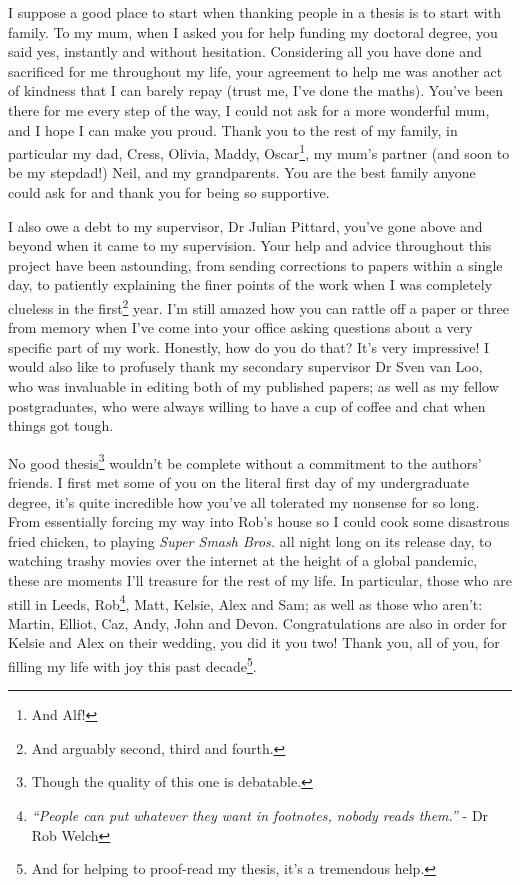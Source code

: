 

\begin{acknowledgements}      %

\setlength{\parindent}{17.62482pt}
\setlength{\parskip}{0.0pt plus 1.0pt}

I suppose a good place to start when thanking people in a thesis is to start with family.
To my mum, when I asked you for help funding my doctoral degree, you said yes, instantly and without hesitation.
Considering all you have done and sacrificed for me throughout my life, your agreement to help me was another act of kindness that I can barely repay (trust me, I've done the maths).
You've been there for me every step of the way, I could not ask for a more wonderful mum, and I hope I can make you proud.
Thank you to the rest of my family, in particular my dad, Cress, Olivia, Maddy, Oscar\footnote{And Alf!}, my mum's partner (and soon to be my stepdad!) Neil, and my grandparents.
You are the best family anyone could ask for and thank you for being so supportive.

I also owe a debt to my supervisor, Dr Julian Pittard, you've gone above and beyond when it came to my supervision.
Your help and advice throughout this project have been astounding, from sending corrections to papers within a single day, to patiently explaining the finer points of the work when I was completely clueless in the first\footnote{And arguably second, third and fourth.} year.
I'm still amazed how you can rattle off a paper or three from memory when I've come into your office asking questions about a very specific part of my work.
Honestly, how do you do that? It's very impressive!
I would also like to profusely thank my secondary supervisor Dr Sven van Loo, who was invaluable in editing both of my published papers; as well as my fellow postgraduates, who were always willing to have a cup of coffee and chat when things got tough.

No good thesis\footnote{Though the quality of this one is debatable.} wouldn't be complete without a commitment to the authors' friends.
I first met some of you on the literal first day of my undergraduate degree, it's quite incredible how you've all tolerated my nonsense for so long.
From essentially forcing my way into Rob's house so I could cook some disastrous fried chicken, to playing \textit{Super Smash Bros.} all night long on its release day, to watching trashy movies over the internet at the height of a global pandemic, these are moments I'll treasure for the rest of my life.
In particular, those who are still in Leeds, Rob\footnote{\emph{``People can put whatever they want in footnotes, nobody reads them.''} - Dr Rob Welch}, Matt, Kelsie, Alex and Sam; as well as those who aren't: Martin, Elliot, Caz, Andy, John and Devon.
Congratulations are also in order for Kelsie and Alex on their wedding, you did it you two!
Thank you, all of you, for filling my life with joy this past decade\footnote{And for helping to proof-read my thesis, it's a tremendous help.}.


\end{acknowledgements}
